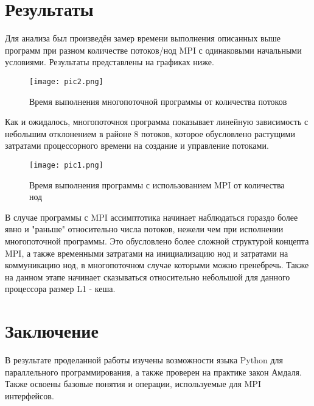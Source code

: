 \documentclass[12pt]{report}
\begin{document}
\chapter*{Результаты}
\par Для анализа был произведён замер времени выполнения описанных выше программ при разном количестве потоков/нод MPI с одинаковыми начальными условиями. Результаты представлены на графиках ниже.
\begin{figure}[h!]
	\centering
	\captionsetup{justification=centering}
	\texttt{[image: pic2.png]}
	\caption{Время выполнения многопоточной программы от количества потоков}
	\label{fig:Graph 1}
\end{figure}
\par Как и ожидалось, многопоточноя программа показывает линейную зависимость с небольшим отклонением в районе 8 потоков, которое обусловлено растущими затратами процессорного времени на создание и управление потоками.
\begin{figure}[h!]
	\centering
	\captionsetup{justification=centering}
	\texttt{[image: pic1.png]}
	\caption{Время выполнения программы с использованием MPI от количества нод}
	\label{fig:Graph 2}
\end{figure}
\par В случае программы с MPI ассимптотика начинает наблюдаться гораздо более явно и "раньше" относительно числа потоков, нежели чем при исполнении многопоточной программы. Это обусловлено более сложной структурой концепта MPI, а также временными затратами на инициализацию нод и затратами на коммуникацию нод, в многопоточном случае которыми можно пренебречь. Также на данном этапе начинает сказываться относительно небольшой для данного процессора размер L1 - кеша.


\chapter*{Заключение}
\par В результате проделанной работы изучены возможности языка Python для параллельного программирования, а также проверен на практике закон Амдаля. Также освоены базовые понятия и операции, используемые для MPI интерфейсов.
\end{document}
